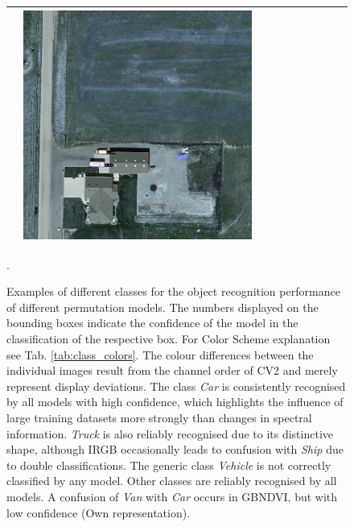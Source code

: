 \begin{figure}[H]
\begin{tabularx}{\textwidth}{c|*{9}{X}}
    & \includegraphics[trim={300pt 355pt 610pt 570pt},clip,width=\linewidth]{images/015Results/02perm_exp/comp_images/rgbndvi/198.png} \\ \hline



\end{tabularx}
\caption[Permutation Experiments: Examples of different classes for the object recognition performance]{Examples of different classes for the object recognition performance of different permutation models. The numbers displayed on the bounding boxes indicate the confidence of the model in the classification of the respective box. For Color Scheme explanation see Tab. \ref{tab:class_colors}. The colour differences between the individual images result from the channel order of \acrshort{CV2} and merely represent display deviations. The class \textit{Car} is consistently recognised by all models with high confidence, which highlights the influence of large training datasets more strongly than changes in spectral information. \textit{Truck} is also reliably recognised due to its distinctive shape, although IRGB occasionally leads to confusion with \textit{Ship} due to double classifications. The generic class \textit{Vehicle} is not correctly classified by any model. Other classes are reliably recognised by all models. A confusion of \textit{Van} with \textit{Car} occurs in \acrshort{GBNDVI}, but with low confidence (Own representation).}
\label{fig:perm_exp_example_pics}.
\end{figure}